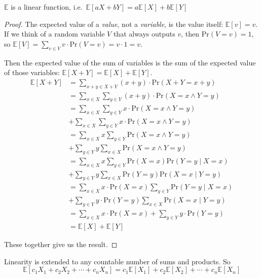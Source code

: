 \documentclass[main.tex]{subfiles}
\begin{document}
\begin{prop}
	\(\mathbb{E}\) is a linear function, i.e.\ \(\mathbb{E}[aX+bY] = a\mathbb{E}[X] + b\mathbb{E}[Y]\)
\end{prop}

\begin{proof}
	The expected value of a \textit{value}, not a \textit{variable}, is the value itself: \(\mathbb{E}[v] = v\). If we think of a random variable \(V\) that always outputs \(v\), then  \(\mathrm{Pr}(V=v) = 1\), so \(\mathbb{E}[V] = \sum_{v \in V} v \cdot \mathrm{Pr}(V = v) = v \cdot 1 = v\).
	
	Then the expected value of the sum of variables is the sum of the expected value of those variables: \(\mathbb{E}[X+Y] = \mathbb{E}[X] + \mathbb{E}[Y]\).
	\begin{align*}
	\mathbb{E}[X+Y] &= \sum_{x+y \in X+Y} (x+y) \cdot \mathrm{Pr}(X+Y = x+y) \\
	&= \sum_{x \in X} \sum_{y \in Y} (x+y) \cdot \mathrm{Pr}(X = x \land Y = y) \\
	&= \sum_{x \in X} \sum_{y \in Y} x \cdot \mathrm{Pr}(X = x \land Y = y) \\
	 &+ \sum_{x \in X} \sum_{y \in Y} x \cdot \mathrm{Pr}(X = x \land Y = y) \\
	&= \sum_{x \in X} x \sum_{y \in Y} \mathrm{Pr}(X = x \land Y = y) \\
	 &+ \sum_{y \in Y} y \sum_{x \in X} \mathrm{Pr}(X = x \land Y = y) \\
	&= \sum_{x \in X} x \sum_{y \in Y} \mathrm{Pr}(X = x)\mathrm{Pr}(Y=y \mid X=x) \\
	 &+ \sum_{y \in Y} y \sum_{x \in X} \mathrm{Pr}(Y = y)\mathrm{Pr}(X=x \mid Y=y) \\
	&= \sum_{x \in X} x \cdot \mathrm{Pr}(X = x) \sum_{y \in Y} \mathrm{Pr}(Y=y \mid X=x) \\
	 &+ \sum_{y \in Y} y \cdot \mathrm{Pr}(Y = y) \sum_{x \in X} \mathrm{Pr}(X=x \mid Y=y) \\
	&= \sum_{x \in X} x \cdot \mathrm{Pr}(X = x) + \sum_{y \in Y} y \cdot \mathrm{Pr}(Y = y) \\
	&= \mathbb{E}[X] + \mathbb{E}[Y]
	\end{align*}
	
	These together give us the result.
\end{proof}

\begin{rem}
	Linearity is extended to any countable number of sums and products. So \[\mathbb{E}[c_1 X_1 + c_2 X_2 + \cdots + c_n X_n] = c_1\mathbb{E}[X_1] + c_2\mathbb{E}[X_2] + \cdots + c_n\mathbb{E}[X_n]\]
\end{rem}
\end{document}
